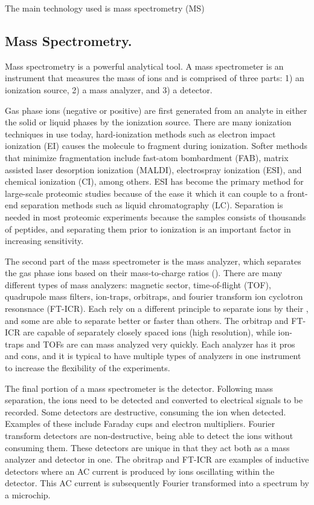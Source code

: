 The main technology used is mass spectrometry (MS)

\subsection*{Mass Spectrometry.}
Mass spectrometry is a powerful analytical tool. A mass spectrometer is an instrument that measures the mass of ions and is comprised of three parts: 1) an ionization source, 2) a mass analyzer, and 3) a detector. 

Gas phase ions (negative or positive) are first generated from an analyte in either the solid or liquid phases by the ionization source. There are many ionization techniques in use today, hard-ionization methods such as electron impact ionization (EI) causes the molecule to fragment during ionization. Softer methods that minimize fragmentation include fast-atom bombardment (FAB), matrix assisted laser desorption ionization (MALDI), electrospray ionization (ESI), and chemical ionization (CI), among others. ESI has become the primary method for large-scale proteomic studies because of the ease it which it can couple to a front-end separation methods such as liquid chromatography (LC). Separation is needed in most proteomic experiments because the samples consists of thousands of peptides, and separating them prior to ionization is an important factor in increasing sensitivity. 

The second part of the mass spectrometer is the mass analyzer, which separates the gas phase ions based on their mass-to-charge ratios (\mz{}). There are many different types of mass analyzers: magnetic sector, time-of-flight (TOF), quadrupole mass filters, ion-traps, orbitraps, and fourier transform ion cyclotron resonsnace (FT-ICR). Each rely on a different principle to separate ions by their \mz{}, and some are able to separate better or faster than others. The orbitrap and FT-ICR are capable of separately closely spaced \mz{} ions (high resolution), while ion-traps and TOFs are can mass analyzed very quickly. Each analyzer has it pros and cons, and it is typical to have multiple types of analyzers in one instrument to increase the flexibility of the experiments.

The final portion of a mass spectrometer is the detector. Following mass separation, the ions need to be detected and converted to electrical signals to be recorded. Some detectors are destructive, consuming the ion when detected. Examples of these include Faraday cups and electron multipliers. Fourier transform detectors are non-destructive, being able to detect the ions without consuming them. These detectors are unique in that they act both as a mass analyzer and detector in one. The obritrap and FT-ICR are examples of inductive detectors where an AC current is produced by ions oscillating within the detector. This AC current is subsequently Fourier transformed into a \mz{} spectrum by a microchip.

